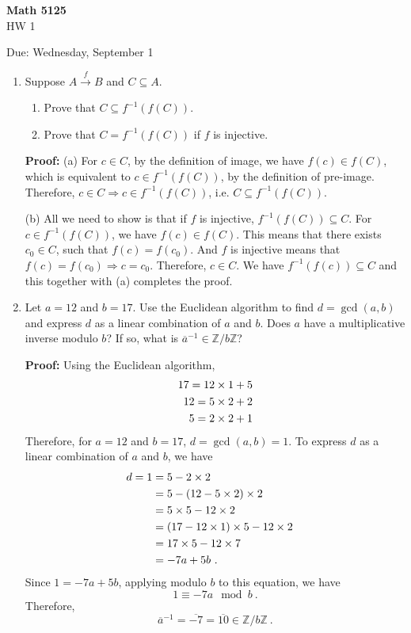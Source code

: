 \documentclass[12pt]{article}
\newcommand{\Z}{\mathbb{Z}}
\begin{document}
\begin{center}
{\bf Math 5125}\\
HW 1
\smallskip

Due: Wednesday, September 1
\end{center}


\begin{enumerate}

\item Suppose $A \overset{f}{\to} B$ and $C\subseteq A$.
\begin{enumerate}
\item Prove that $C\subseteq f^{-1}(f(C))$.
\item Prove that $C=f^{-1}(f(C))$ if $f$ is injective.
\end{enumerate}

\smallskip
{\bf Proof:} (a) For $c \in C$, by the definition of image, we have $f(c) \in f(C)$, which is equivalent to $c \in f^{-1}(f(C))$, by the definition of pre-image. Therefore, $c \in C \Rightarrow c \in f^{-1}(f(C))$, i.e. $C \subseteq f^{-1}(f(C))$.

(b) All we need to show is that if $f$ is injective, $f^{-1}(f(C)) \subseteq C$. For $c \in f^{-1}(f(C))$, we have $f(c) \in f(C)$. This means that there exists $c_0 \in C$, such that $f(c) = f(c_0)$. And $f$ is injective means that $f(c) = f(c_0) \Rightarrow c = c_0$. Therefore, $c \in C$. We have $f^{-1}(f(c)) \subseteq C$ and this together with (a) completes the proof.

\newpage

\item Let $a=12$ and $b=17$. Use the Euclidean algorithm to find $d=\gcd(a,b)$ and express $d$ as a linear combination of $a$ and $b$. Does $a$ have a multiplicative inverse modulo $b$? If so, what is $\overline{a}^{-1}\in\Z/b\Z$?

\smallskip
{\bf Proof:} Using the Euclidean algorithm,
\begin{align}
    17 = 12 \times 1 + 5\cr
    12 = 5 \times 2 + 2\cr
    5 = 2 \times 2 + 1\nonumber
\end{align}
Therefore, for $a = 12$ and $b = 17$, $d = \gcd(a,b) = 1$. To express $d$ as a linear combination of $a$ and $b$, we have
\begin{align}
    d = 1 &= 5 - 2 \times 2 \cr
     &= 5 - (12 - 5 \times 2) \times 2 \cr
     &= 5 \times 5 - 12 \times 2 \cr
     &= (17 - 12 \times 1) \times 5 - 12 \times 2 \cr
     &= 17 \times 5 - 12 \times 7 \cr
     &= -7 a + 5 b~. \nonumber
\end{align}
Since $1 = -7 a + 5 b$, applying modulo $b$ to this equation, we have
$$
1 \equiv -7 a \mod b~.
$$
Therefore,
$$
\overline{a}^{-1} = \overline{-7} = \overline{10} \in \Z/b\Z~.
$$


\end{enumerate}
\end{document}
